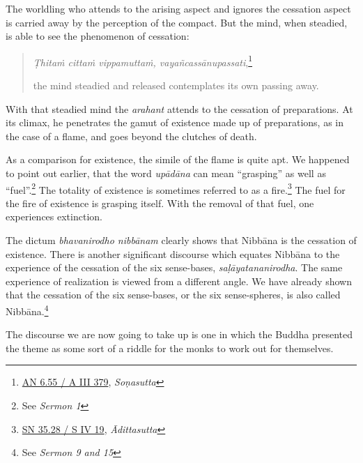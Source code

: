 The worldling who attends to the arising aspect and ignores the cessation aspect is carried away by the perception of the compact. But the mind, when steadied, is able to see the phenomenon of cessation:

\begin{quote}
\emph{Ṭhitaṁ cittaṁ vippamuttaṁ, vayañcassānupassati},\footnote{\href{https://suttacentral.net/an6.55/pli/ms}{AN 6.55 / A III 379}, \emph{Soṇasutta}}

the mind steadied and released contemplates its own passing away.
\end{quote}

With that steadied mind the \emph{arahant} attends to the cessation of preparations. At its climax, he penetrates the gamut of existence made up of preparations, as in the case of a flame, and goes beyond the clutches of death.

As a comparison for existence, the simile of the flame is quite apt. We happened to point out earlier, that the word \emph{upādāna} can mean ``grasping'' as well as ``fuel''.\footnote{See \emph{Sermon 1}} The totality of existence is sometimes referred to as a fire.\footnote{\href{https://suttacentral.net/sn35.28/pli/ms}{SN 35.28 / S IV 19}, \emph{Ādittasutta}} The fuel for the fire of existence is grasping itself. With the removal of that fuel, one experiences extinction.

The dictum \emph{bhavanirodho nibbānam} clearly shows that Nibbāna is the cessation of existence. There is another significant discourse which equates Nibbāna to the experience of the cessation of the six sense-bases, \emph{saḷāyatananirodha}. The same experience of realization is viewed from a different angle. We have already shown that the cessation of the six sense-bases, or the six sense-spheres, is also called Nibbāna.\footnote{See \emph{Sermon 9 and 15}}

The discourse we are now going to take up is one in which the Buddha presented the theme as some sort of a riddle for the monks to work out for themselves.

